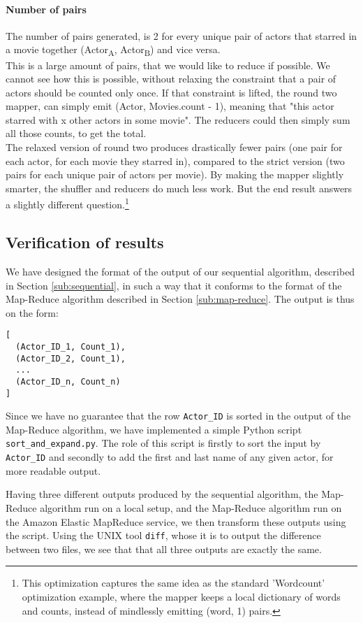 \documentclass[a4paper,11pt]{article}
\begin{document}
\paragraph{Number of pairs}
The number of pairs generated, is 2 for every unique pair of actors that starred in a movie together (Actor\textsubscript{A}, Actor\textsubscript{B}) and vice versa.\\
This is a large amount of pairs, that we would like to reduce if possible. We cannot see how this is possible, without relaxing the constraint that a pair of actors should be counted only once. If that constraint is lifted, the round two mapper, can simply emit (Actor, Movies.count - 1), meaning that "this actor starred with x other actors in some movie". The reducers could then simply sum all those counts, to get the total.\\
The relaxed version of round two produces drastically fewer pairs (one pair for each actor, for each movie they starred in), compared to the strict version (two pairs for each unique pair of actors per movie). By making the mapper slightly smarter, the shuffler and reducers do much less work. But the end result answers a slightly different question.\footnote{This optimization captures the same idea as the standard 'Wordcount' optimization example, where the mapper keeps a local dictionary of words and counts, instead of mindlessly emitting (word, 1) pairs.}

\subsection{Verification of results}
We have designed the format of the output of our sequential algorithm, described in Section \ref{sub:sequential}, in such a way that it conforms to the format of the Map-Reduce algorithm described in Section \ref{sub:map-reduce}. 
The output is thus on the form:
\begin{verbatim}
[ 
  (Actor_ID_1, Count_1),
  (Actor_ID_2, Count_1),
  ...
  (Actor_ID_n, Count_n)
]
\end{verbatim}
Since we have no guarantee that the row \texttt{Actor\_ID} is sorted in the output of the Map-Reduce algorithm, we have implemented a simple Python script \texttt{sort\_and\_expand.py}. 
The role of this script is firstly to sort the input by \texttt{Actor\_ID} and secondly to add the first and last name of any given actor, for more readable output.

Having three different outputs produced by the sequential algorithm, the Map-Reduce algorithm run on a local setup, and the Map-Reduce algorithm run on the Amazon Elastic MapReduce service, we then transform these outputs using the script.
Using the UNIX tool \texttt{diff}, whose it is to output the difference between two files, we see that that all three outputs are exactly the same.
\end{document}

